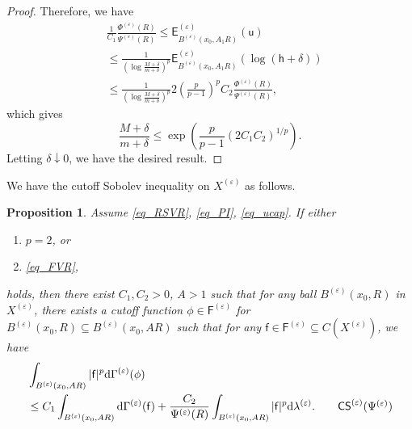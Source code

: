 \documentclass[11pt,a4paper]{article}
\numberwithin{equation}{section}
\theoremstyle{plain}
\newtheorem{proposition}[theorem]{Proposition}
\theoremstyle{definition}
\begin{document}
\begin{proof}
Therefore, we have
\begin{align*}
&\frac{1}{C_1}\frac{\Phi^{(\varepsilon)}(R)}{\Psi^{(\varepsilon)}(R)}\le \mathsf{E}^{(\varepsilon)}_{B^{(\varepsilon)}(x_0,A_1R)}(\mathsf{u})\\
&\le \frac{1}{\left(\log \frac{M+\delta}{m+\delta}\right)^p}\mathsf{E}^{(\varepsilon)}_{B^{(\varepsilon)}(x_0,A_1R)}\left(\log(\mathsf{h}+\delta)\right)\\
&\le \frac{1}{\left(\log \frac{M+\delta}{m+\delta}\right)^p}2 \left(\frac{p}{p-1}\right)^pC_2 \frac{\Phi^{(\varepsilon)}(R)}{\Psi^{(\varepsilon)}(R)},
\end{align*}
which gives
$$\frac{M+\delta}{m+\delta}\le\exp \left(\frac{p}{p-1}\left(2C_1C_2\right)^{1/p}\right).$$
Letting $\delta\downarrow0$, we have the desired result.
\end{proof}

We have the cutoff Sobolev inequality on $X^{(\varepsilon)}$ as follows.

\begin{proposition}\label{prop_CS_Xeps}
Assume \ref{eq_RSVR}, \ref{eq_PI}, \ref{eq_ucap}. If either
\begin{enumerate}[label=(\arabic*)]
\item $p=2$, or
\item \ref{eq_FVR},
\end{enumerate}
holds, then there exist $C_{1}, C_{2}>0$, $A>1$ such that for any ball $B^{(\varepsilon)}(x_0,R)$ in $X^{(\varepsilon)}$, there exists a cutoff function $\phi\in\mathsf{F}^{(\varepsilon)}$ for $B^{(\varepsilon)}(x_0,R)\subseteq B^{(\varepsilon)}(x_0,AR)$ such that for any $\mathsf{f}\in\mathsf{F}^{(\varepsilon)}\subseteq C(X^{(\varepsilon)})$, we have
\begin{align*}
&\int_{B^{(\varepsilon)}(x_0,AR)}|{\mathsf{f}}|^p\mathrm{d}\Gamma^{(\varepsilon)}(\phi)\\
&\le C_{1}\int_{B^{(\varepsilon)}(x_0,AR)}\mathrm{d}\Gamma^{(\varepsilon)}(\mathsf{f})+\frac{C_{2}}{\Psi^{(\varepsilon)}(R)}\int_{B^{(\varepsilon)}(x_0,AR)}|\mathsf{f}|^p\mathrm{d} \lambda^{(\varepsilon)}.\label{eq_CS_Xeps}\tag*{$\mathsf{CS}^{(\varepsilon)}(\Psi^{(\varepsilon)})$}
\end{align*}
\end{proposition}
\end{document}
